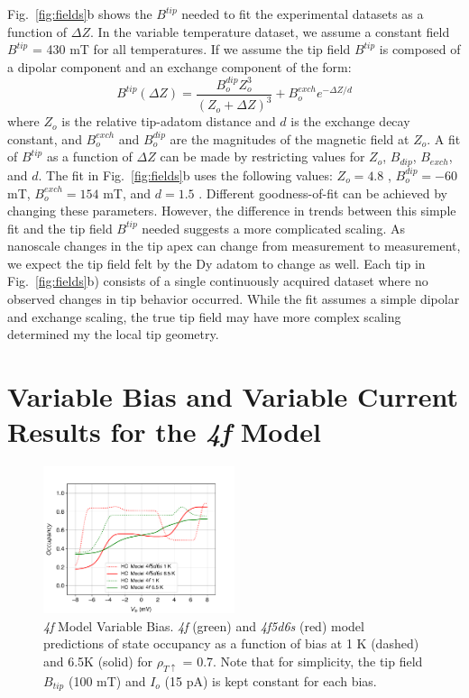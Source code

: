 \documentclass[reprint,amsmath,amssymb,aps,nofootinbib,onecolumn]{revtex4-2}
\begin{document}
Fig.~\ref{fig:fields}b shows the $B^{tip}$ needed to fit the experimental datasets as a function of $\Delta Z$. In the variable temperature dataset, we assume a constant field $B^{tip}$ = 430 mT for all temperatures. If we assume the tip field $B^{tip}$ is composed of a dipolar component and an exchange component of the form:
\begin{equation}
B^{tip}(\Delta Z) =  \frac{B^{dip}_{o} Z^{3}_{o}}{(Z_{o}+\Delta Z)^{3}} + B^{exch}_{o} e^{-\Delta Z/d}
\label{eq:fit}
\end{equation}
where $Z_o$ is the relative tip-adatom distance and $d$ is the exchange decay constant, and $B^{exch}_{o}$ and $B^{dip}_{o}$ are the magnitudes of the magnetic field at $Z_o$. A fit of $B^{tip}$ as a function of $\Delta Z$ can be made by restricting values for $Z_o$, $B_{dip}$, $B_{exch}$, and $d$. The fit in Fig.~\ref{fig:fields}b uses the following values: $Z_o = 4.8$ \text{\normalfont\AA}, $B^{dip}_o = -60$ mT, $B^{exch}_o = 154$ mT, and $d = 1.5$ \text{\normalfont\AA}. Different goodness-of-fit can be achieved by changing these parameters. However, the difference in trends between this simple fit and the tip field $B^{tip}$ needed suggests a more complicated scaling. As nanoscale changes in the tip apex can change from measurement to measurement, we expect the tip field felt by the Dy adatom to change as well. Each tip in Fig.~\ref{fig:fields}b) consists of a single continuously acquired dataset where no observed changes in tip behavior occurred. While the fit assumes a simple dipolar and exchange scaling, the true tip field may have more complex scaling determined my the local tip geometry.

\section{Variable Bias and Variable Current Results for the \textit{4f} Model}
\begin{figure}[h!]
\includegraphics[width=0.5\textwidth]{model_4f.pdf}
\caption{\textit{4f} Model Variable Bias. \textit{4f} (green) and \textit{4f5d6s} (red) model predictions of state occupancy as a function of bias at 1 K (dashed) and 6.5K (solid) for $\rho_{T \uparrow}$ = 0.7. Note that for simplicity, the tip field $B_{tip}$ (100 mT) and $I_o$ (15 pA) is kept constant for each bias. 
\label{fig:bias_curr} }
\end{figure}
\end{document}
